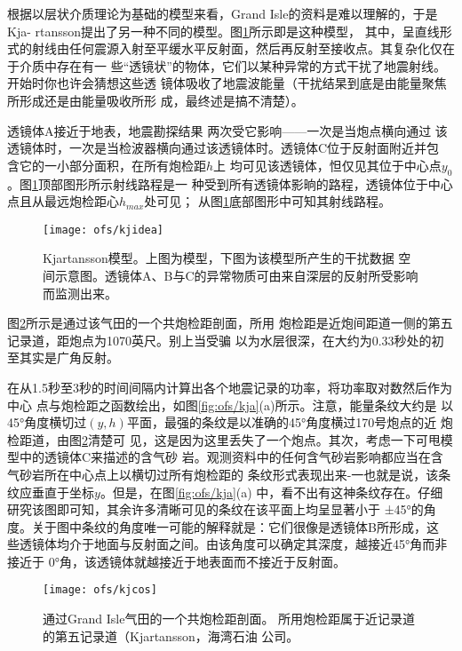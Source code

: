 根据以层状介质理论为基础的模型来看，Grand
Isle的资料是难以理解的，于是Kja-
rtansson提出了另一种不同的模型。图\ref{fig:ofs/kjidea}所示即是这种模型，
其中，呈直线形式的射线由任何震源入射至平缓水平反射面，然后再反射至接收点。其复杂化仅在于介质中存在有一
些“透镜状”的物体，它们以某种异常的方式干扰了地震射线。开始时你也许会猜想这些透
镜体吸收了地震波能量（干扰结杲到底是由能量聚焦所形成还是由能量吸收所形
成，最终述是搞不清楚）。

透镜体A接近于地表，地震勘探结果 两次受它影响——一次是当炮点横向通过
该透镜体时，一次是当检波器横向通过该透镜体时。透镜体C位于反射面附近并包
含它的一小部分面积，在所有炮检距$h$上
均可见该透镜体，怛仅见其位于中心点$y_0$。图\ref{fig:ofs/kjidea}顶部图形所示射线路程是一
种受到所有透镜体影晌的路程，透镜体位于中心点且从最远炮检距心$h_{max}$处可见；
从图\ref{fig:ofs/kjidea}底部图形中可知其射线路程。
\begin{figure}[H]
\centering
\texttt{[image: ofs/kjidea]}
\caption[kjidea]{Kjartansson模型。上图为模型，下图为该模型所产生的干扰数据
空间示意图。透镜体A、B与C的异常物质可由来自深层的反射所受影响而监测出来。
}
\label{fig:ofs/kjidea}
\end{figure}
图\ref{fig:ofs/kjcos}所示是通过该气田的一个共炮检距剖面，所用
炮检距是近炮间距道一侧的第五记录道，距炮点为1070英尺。别上当受骗
以为水层很深，在大约为0.33秒处的初至其实是广角反射。

在从1.5秒至3秒的时间间隔内计算出各个地震记录的功率，将功率取对数然后作为中心
点与炮检距之函数绘出，如图\ref{fig:ofs/kja}(a)所示。注意，能量条纹大约是
以45°角度横切过$(y,h)$平面，最强的条纹是以准确的45°角度横过170号炮点的近
炮检距道，由图\ref{fig:ofs/kjcos}清楚可
见，这是因为这里丢失了一个炮点。其次，考虑一下可甩模型中的透镜体C来描述的含气砂
岩。观测资料中的任何含气砂岩影响都应当在含气砂岩所在中心点上以横切过所有炮检距的
条纹形式表现出来-一也就是说，该条纹应垂直于坐标$y$。但是，在图\ref{fig:ofs/kja}(a)
中，看不出有这神条纹存在。仔细研究该图即可知，其余许多清晰可见的条纹在该平面上均呈显著小于
±45°的角度。关于图中条纹的角度唯一可能的解释就是：它们很像是透镜体B所形成，这
些透镜体均介于地面与反射面之间。由该角度可以确定其深度，越接近45°角而非接近于
0°角，该透镜体就越接近于地表面而不接近于反射面。

\begin{figure}[H]
\centering
\texttt{[image: ofs/kjcos]}
\caption[kjcos]{通过Grand Isle气田的一个共炮检距剖面。
所用炮检距属于近记录道的第五记录道（Kjartansson，海湾石油
公司。}
\label{fig:ofs/kjcos}
\end{figure}

